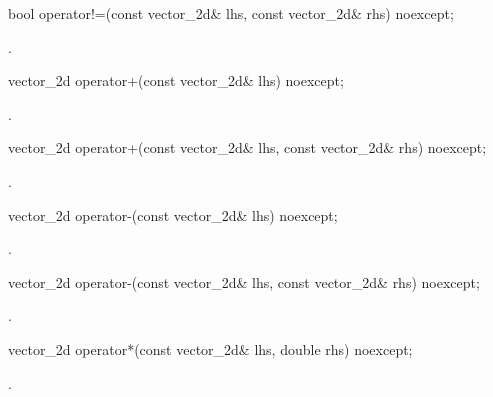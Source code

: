 \begin{itemdecl}
	bool operator!=(const vector_2d& lhs, const vector_2d& rhs) noexcept;
\end{itemdecl}
\begin{itemdescr}
	\pnum
	\returns
	.
\end{itemdescr}

\begin{itemdecl}
vector_2d operator+(const vector_2d& lhs) noexcept;
\end{itemdecl}
\begin{itemdescr}
	\pnum
	\returns
	.
\end{itemdescr}

\begin{itemdecl}
vector_2d operator+(const vector_2d& lhs, const vector_2d& rhs) noexcept;
\end{itemdecl}
\begin{itemdescr}
	\pnum
	\returns
	.
\end{itemdescr}

\begin{itemdecl}
vector_2d operator-(const vector_2d& lhs) noexcept;
\end{itemdecl}
\begin{itemdescr}
	\pnum
	\returns
	.
\end{itemdescr}

\begin{itemdecl}
vector_2d operator-(const vector_2d& lhs, const vector_2d& rhs) noexcept;
\end{itemdecl}
\begin{itemdescr}
	\pnum
	\returns
	.
\end{itemdescr}

\begin{itemdecl}
vector_2d operator*(const vector_2d& lhs, double rhs) noexcept;
\end{itemdecl}
\begin{itemdescr}
	\pnum
	\returns
	.
\end{itemdescr}

